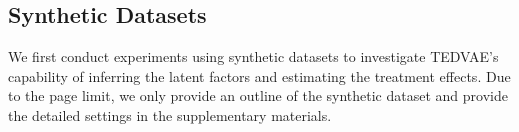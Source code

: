 \documentclass[letterpaper]{article} %
\begin{document}
%
%

\subsection*{Synthetic Datasets}
We first conduct experiments using synthetic datasets to investigate TEDVAE's capability of inferring the latent factors and estimating the treatment effects. Due to the page limit, we only provide an outline of the synthetic dataset and provide the detailed settings in the supplementary materials.
\end{document}
